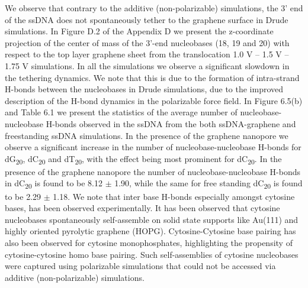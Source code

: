We observe that contrary to the additive (non-polarizable) simulations, the 3’ end of the ssDNA does not spontaneously tether to the graphene surface in Drude simulations. In Figure D.2 of the Appendix D we present the z-coordinate projection of the center of mass of the 3’-end nucleobases (18, 19 and 20) with respect to the top layer graphene sheet from the translocation 1.0 V – 1.5 V – 1.75 V simulations. In all the simulations we observe a significant slowdown in the tethering dynamics. We note that this is due to the formation of intra-strand H-bonds between the nucleobases in Drude simulations, due to the improved description of the H-bond dynamics in the polarizable force field.\supercite{lemkul_induced_2014} In Figure 6.5(b) and Table 6.1 we present the statistics of the average number of nucleobase-nucleobase H-bonds observed in the ssDNA from the both ssDNA-graphene and freestanding ssDNA simulations. In the presence of the graphene nanopore we observe a significant increase in the number of nucleobase-nucleobase H-bonds for dG\textsubscript{20}, dC\textsubscript{20} and dT\textsubscript{20}, with the effect being most prominent for dC\textsubscript{20}. In the presence of the graphene nanopore the number of nucleobase-nucleobase H-bonds in dC\textsubscript{20} is found to be 8.12 $\pm$ 1.90, while the same for free standing dC\textsubscript{20} is found to be 2.29 $\pm$ 1.18. We note that inter base H-bonds especially amongst cytosine bases, has been observed experimentally. It has been observed that cytosine nucleobases spontaneously self-assemble on solid state supports like Au(111)\supercite{otero_elementary_2008,wandlowski_structure_1996} and highly oriented pyrolytic graphene (HOPG).\supercite{xu_coadsorption_2006} Cytosine-Cytosine base pairing has also been observed for cytosine monophosphates,\supercite{li_full_2023} highlighting the propensity of cytosine-cytosine homo base pairing. Such self-assemblies of cytosine nucleobases were captured using polarizable simulations that could not be accessed via additive (non-polarizable) simulations.\supercite{h_capturing_2022} 
